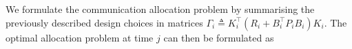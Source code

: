 \documentclass[letterpaper, 10 pt, conference]{ieeeconf}  %
\newcommand{\todo}[1]{
	\begin{center}
		\fcolorbox{wheat}{wheat}{\parbox[t]{0.9\linewidth}{\textbf{ToDo:} #1}}
	\end{center}}
\begin{document}
We formulate the communication allocation problem by summarising the previously described design choices %
in matrices $\Gamma_i \triangleq K_i^\top\left ( R_i+B_i^\top P_iB_i\right )K_i$. 
The optimal allocation problem at time $j$ can then be formulated as
%
%
\end{document}
